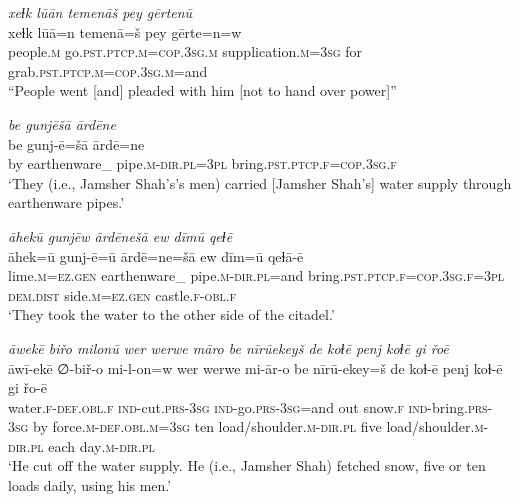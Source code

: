 \ea \label{DP.29}
\textit{xeɫk lūān temenāš pey gērtenū} \\ 
\gll xeɫk lūā=n temenā=š pey gērte=n=w \\ 
 people\textsc{.m} go\textsc{.pst}\textsc{.ptcp}\textsc{.m}\textsc{=cop}\textsc{.3sg}\textsc{.m} supplication\textsc{.m}\textsc{=3sg} for grab\textsc{.pst}\textsc{.ptcp}\textsc{.m}\textsc{=cop}\textsc{.3sg}\textsc{.m}=and \\ 
\glt ``People went [and] pleaded with him [not to hand over power]''
\z 
 
\ea \label{DP.31}
\textit{be gunjēšā ārdēne} \\ 
\gll be gunj-ē=šā ārdē=ne \\ 
 by earthenware\_ pipe\textsc{.m}\textsc{-dir}\textsc{.pl}\textsc{=3pl} bring\textsc{.pst}\textsc{.ptcp}\textsc{\textsc{.f}}\textsc{=cop}\textsc{.3sg}\textsc{\textsc{.f}} \\ 
\glt `They (i.e., Jamsher Shah’s’s men) carried [Jamsher Shah’s] water supply through earthenware pipes.'
\z 
 
\ea \label{DP.32}
\textit{āhekū gunjēw ārdēnešā ew dīmū qeɫē} \\ 
\gll āhek=ū gunj-ē=ū ārdē=ne=šā ew dīm=ū qeɫā-ē \\ 
 lime\textsc{.m}\textsc{=ez}\textsc{.gen} earthenware\_ pipe\textsc{.m}\textsc{-dir}\textsc{.pl}=and bring\textsc{.pst}\textsc{.ptcp}\textsc{\textsc{.f}}\textsc{=cop}\textsc{.3sg}\textsc{\textsc{.f}}\textsc{=3pl} \textsc{dem.dist} side\textsc{.m}\textsc{=ez}\textsc{.gen} castle\textsc{\textsc{.f}}\textsc{-obl}\textsc{\textsc{.f}} \\ 
\glt `They took the water to the other side of the citadel.'
\z 
 
\ea \label{DP.34}
\textit{āwekē biřo milonū wer werwe māro be nīrūekeyš de koɫē penj koɫē gi řoē} \\ 
\gll āwī-ekē ∅-biř-o mi-l-on=w wer werwe mi-ār-o be nīrū-ekey=š de koɫ-ē penj koɫ-ē gi řo-ē \\ 
 water\textsc{\textsc{.f}}\textsc{-def}\textsc{.obl}\textsc{\textsc{.f}} \textsc{ind-}cut\textsc{.prs}\textsc{-3sg} \textsc{ind-}go\textsc{.prs}\textsc{-3sg}=and out snow\textsc{\textsc{.f}} \textsc{ind-}bring\textsc{.prs}\textsc{-3sg} by force\textsc{.m}\textsc{-def}\textsc{.obl}\textsc{.m}\textsc{=3sg} ten load/shoulder\textsc{.m}\textsc{-dir}\textsc{.pl} five load/shoulder\textsc{.m}\textsc{-dir}\textsc{.pl} each day\textsc{.m}\textsc{-dir}\textsc{.pl} \\ 
\glt `He cut off the water supply. He (i.e., Jamsher Shah) fetched snow, five or ten loads daily, using his men.'
\z 
 
